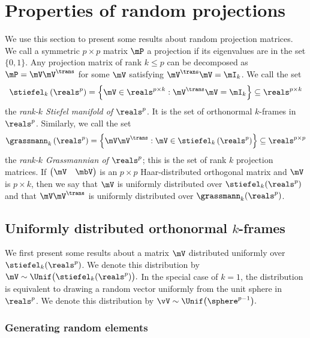 
\chapter{Properties of random projections}

We use this section to present some results about random projection
matrices.  We call a symmetric $p \times p$ matrix $\mP$ a projection 
if its eigenvalues are in the set $\{ 0, 1 \}$.  Any projection matrix of rank
$k \leq p$ can be decomposed as $\mP = \mV \mV^\trans$ for some $\mV$
satisfying $\mV^\trans \mV = \mI_k$.  We call the set 
\[
    \stiefel_{k}\left( \reals^p \right)
        =
        \left\{
            \mV \in \reals^{p \times k}
            :
            \mV^\trans \mV = \mI_k
        \right\}
        \subseteq
        \reals^{p \times k}
\]
the \emph{rank-$k$ Stiefel manifold of $\reals^p$}.  It is the set
of orthonormal $k$-frames in $\reals^p$.  Similarly, we call 
the set
\[
    \grassmann_k\left( \reals^p \right)
        =
        \left\{
            \mV \mV^\trans
            :
            \mV \in \stiefel_k \left( \reals^p \right)
        \right\}
        \subseteq
        \reals^{p \times p}
\]
the \emph{rank-$k$ Grassmannian of $\reals^p$}; this is the set of
rank $k$ projection matrices.  If
\(
    \left(
    \begin{matrix}
        \mV & \mbV
    \end{matrix}
    \right)
\)
is an $p \times p$ Haar-distributed orthogonal matrix and $\mV$ is
$p \times k$, then we say that $\mV$ is uniformly distributed
over $\stiefel_k( \reals^p )$ and that $\mV \mV^\trans$ is uniformly
distributed over $\grassmann_k(\reals^p)$.


\section{Uniformly distributed orthonormal $k$-frames}

We first present some results about a matrix $\mV$ distributed uniformly
over $\stiefel_k(\reals^p)$.  We denote this distribution by
\(
    \mV 
        \sim
            \Unif \big(
                \stiefel_k(\reals^p)
            \big).
\)
In the special case of $k = 1$, the distribution is equivalent to drawing
a random vector uniformly from the unit sphere in $\reals^p$.  We denote 
this distribution by
\(
    \vV
        \sim
            \Unif \big(
                \sphere^{p-1}
            \big).
\)


\subsection{Generating random elements}

